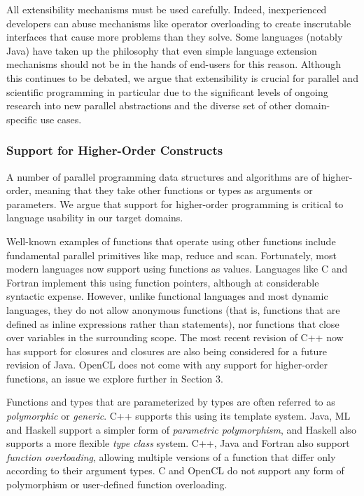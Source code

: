\documentclass{llncs}
\begin{document}
All extensibility mechanisms must be used carefully. Indeed, inexperienced developers can abuse mechanisms like operator overloading to create inscrutable interfaces that cause more problems than they solve. Some languages (notably Java) have taken up the philosophy that even simple language extension mechanisms should not be in the hands of end-users for this reason. Although this continues to be debated, we argue that extensibility is crucial for parallel and scientific programming in particular due to the significant levels of ongoing research into new parallel abstractions and the diverse set of other domain-specific use cases.

\subsubsection{Support for Higher-Order Constructs}\label{hof}
A number of parallel programming data structures and algorithms are of higher-order, meaning that they take other functions or types as arguments or parameters. We argue that support for higher-order programming is critical to language usability in our target domains.

Well-known examples of functions that operate using other functions include fundamental parallel primitives like map, reduce and scan. Fortunately, most modern languages now support using functions as values. Languages like C and Fortran implement this using function pointers, although at considerable syntactic expense. However, unlike functional languages and most dynamic languages, they do not allow anonymous functions (that is, functions that are defined as inline expressions rather than statements), nor functions that close over variables in the surrounding scope. The most recent revision of C++ now has support for closures and closures are also being considered for a future revision of Java. OpenCL does not come with any support for higher-order functions, an issue we explore further in Section 3.

Functions and types that are parameterized by types are often referred to as {\it polymorphic} or {\it generic}. C++ supports this using its template system. Java, ML and Haskell support a simpler form of {\it parametric polymorphism}, and Haskell also supports a more flexible {\it type class} system. C++, Java and Fortran also support {\it function overloading}, allowing multiple versions of a function that differ only according to their argument types. C and OpenCL do not support any form of polymorphism or user-defined function overloading.
\end{document}
